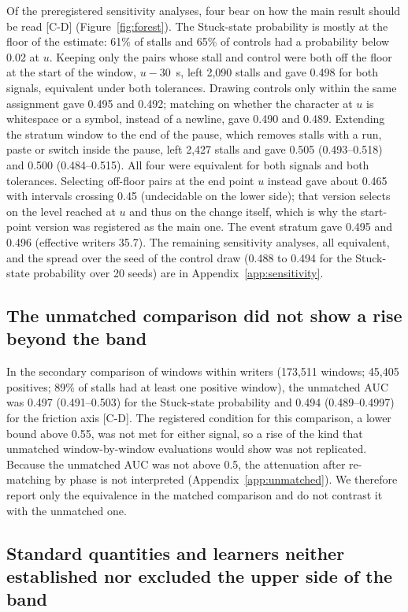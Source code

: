 Of the preregistered sensitivity analyses, four bear on how the main result should be read [C-D]
(Figure~\ref{fig:forest}). The Stuck-state probability is mostly at the floor of the estimate: 61\% of stalls and 65\%
of controls had a probability below 0.02 at $u$. Keeping only the pairs whose stall and control were both off the floor
at the start of the window, $u - 30$~s, left 2,090 stalls and gave 0.498 for both signals, equivalent under both
tolerances. Drawing controls only within the same assignment gave 0.495 and 0.492; matching on whether the character at
$u$ is whitespace or a symbol, instead of a newline, gave 0.490 and 0.489. Extending the stratum window to the end of
the pause, which removes stalls with a run, paste or switch inside the pause, left 2,427 stalls and gave 0.505
(0.493--0.518) and 0.500 (0.484--0.515). All four were equivalent for both signals and both tolerances. Selecting
off-floor pairs at the end point $u$ instead gave about 0.465 with intervals crossing 0.45 (undecidable on the lower
side); that version selects on the level reached at $u$ and thus on the change itself, which is why the start-point
version was registered as the main one. The event stratum gave 0.495 and 0.496 (effective writers 35.7). The remaining
sensitivity analyses, all equivalent, and the spread over the seed of the control draw (0.488 to 0.494 for the
Stuck-state probability over 20 seeds) are in Appendix~\ref{app:sensitivity}.

\subsection{The unmatched comparison did not show a rise beyond the band}

In the secondary comparison of windows within writers (173,511 windows; 45,405 positives; 89\% of stalls had at least one
positive window), the unmatched AUC was 0.497 (0.491--0.503) for the Stuck-state probability and 0.494 (0.489--0.4997)
for the friction axis [C-D]. The registered condition for this comparison, a lower bound above 0.55, was not met for
either signal, so a rise of the kind that unmatched window-by-window evaluations would show was not replicated. Because the unmatched AUC was not above 0.5,
the attenuation after re-matching by phase is not interpreted (Appendix~\ref{app:unmatched}). We therefore report only
the equivalence in the matched comparison and do not contrast it with the unmatched one.

\subsection{Standard quantities and learners neither established nor excluded the upper side of the band}

